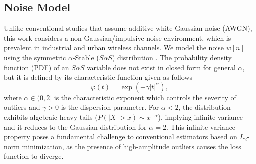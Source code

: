\documentclass[10pt, journal]{IEEEtran}
\begin{document}
\subsection{Noise Model}
Unlike conventional studies that assume additive white Gaussian noise (AWGN), this work considers a non-Gaussian/impulsive noise environment, which is prevalent in industrial and urban wireless channels. We model the noise $w[n]$ using the symmetric $\alpha$-Stable ($S\alpha S$) distribution \cite{shao1993signal}. The probability density function (PDF) of an $S\alpha S$ variable does not exist in closed form for general $\alpha$, but it is defined by its characteristic function given as follows
\begin{equation}
\varphi(t) = \exp\left(-\gamma |t|^\alpha\right),
\label{eq:sas_char}
\end{equation}
where $\alpha \in (0, 2]$ is the characteristic exponent which controls the severity of outliers and $\gamma > 0$ is the dispersion parameter. For $\alpha < 2$, the distribution exhibits algebraic heavy tails ($P(|X|>x) \sim x^{-\alpha}$), implying infinite variance and it reduces to the Gaussian distribution for $\alpha = 2$. This infinite variance property poses a fundamental challenge to conventional estimators based on $L_2$-norm minimization, as the presence of high-amplitude outliers causes the loss function to diverge.

\end{document}
